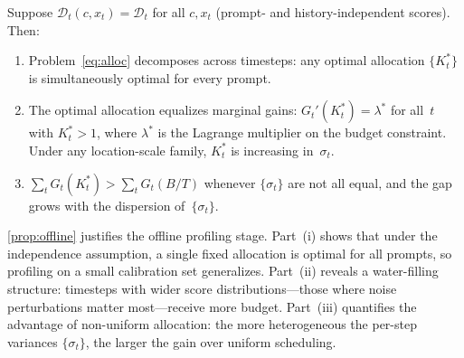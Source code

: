 \begin{proposition}
\label{prop:offline}
Suppose $\mathcal{D}_t(c,x_t)=\mathcal{D}_t$ for all $c,x_t$ (prompt-
and history-independent scores).
Then:
\begin{enumerate}
\item[\textbf{(i)}]
  Problem~\eqref{eq:alloc} decomposes across timesteps: any optimal
  allocation $\{K_t^*\}$ is simultaneously optimal for every prompt.
\item[\textbf{(ii)}]
  The optimal allocation equalizes marginal gains:
  $G_t'(K_t^*)=\lambda^*$ for all~$t$ with $K_t^*>1$,
  where $\lambda^*$ is the Lagrange multiplier on the budget constraint.
  Under any location-scale family, $K_t^*$ is increasing in~$\sigma_t$.
\item[\textbf{(iii)}]
  $\sum_t G_t(K_t^*) > \sum_t G_t(B/T)$ whenever
  $\{\sigma_t\}$ are not all equal, and the gap grows with the
  dispersion of~$\{\sigma_t\}$.
\end{enumerate}
\end{proposition}

\cref{prop:offline} justifies the offline profiling stage.
Part~(i) shows that under the independence assumption, a single fixed
allocation is optimal for all prompts, so profiling on a small calibration
set generalizes.
Part~(ii) reveals a water-filling structure: timesteps with wider score
distributions---those where noise perturbations matter most---receive more
budget.
Part~(iii) quantifies the advantage of non-uniform allocation: the more
heterogeneous the per-step variances $\{\sigma_t\}$, the larger the gain
over uniform scheduling.

